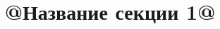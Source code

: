 \documentclass[14pt]{extarticle}
\begin{document}


\tableofcontents
\newpage

\section{@Название секции 1@}


\end{document}
